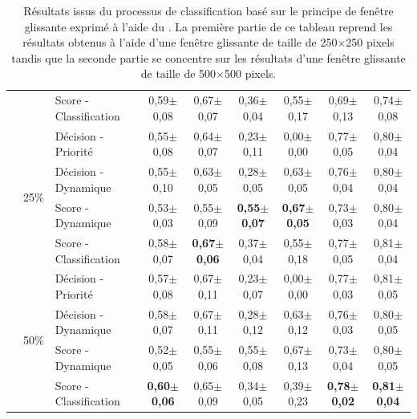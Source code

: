 {\begin{landscape}
\begin{table}[p]
\begin{tabular}{lllcccccc}
							        &                               & Score - Classification    & 0,59$\pm$0,08         & 0,67$\pm$0,07         & 0,36$\pm$0,04         & 0,55$\pm$0,17         & 0,69$\pm$0,13         & 0,74$\pm$0,08         \\ \cline{2-9}
							        & \multirow{4}{*}{25\%}         & Décision - Priorité       & 0,55$\pm$0,08         & 0,64$\pm$0,07         & 0,23$\pm$0,11         & 0,00$\pm$0,00         & 0,77$\pm$0,05         & 0,80$\pm$0,04         \\
							        &                               & Décision - Dynamique      & 0,55$\pm$0,10         & 0,63$\pm$0,05         & 0,28$\pm$0,05         & 0,63$\pm$0,05         & 0,76$\pm$0,04         & 0,80$\pm$0,04         \\
							        &                               & Score - Dynamique         & 0,53$\pm$0,03         & 0,55$\pm$0,09         & \textbf{0,55$\pm$0,07}& \textbf{0,67$\pm$0,05}& 0,73$\pm$0,03         & 0,80$\pm$0,04         \\
							        &                               & Score - Classification    & 0,58$\pm$0,07         & \textbf{0,67$\pm$0,06}& 0,37$\pm$0,04         & 0,55$\pm$0,18         & 0,77$\pm$0,05         & 0,81$\pm$0,04         \\ \cline{2-9}
							        & \multirow{4}{*}{50\%}         & Décision - Priorité       & 0,57$\pm$0,08         & 0,67$\pm$0,11         & 0,23$\pm$0,07         & 0,00$\pm$0,00         & 0,77$\pm$0,03         & 0,81$\pm$0,05         \\
							        &                               & Décision - Dynamique      & 0,58$\pm$0,07         & 0,67$\pm$0,11         & 0,28$\pm$0,12         & 0,63$\pm$0,12         & 0,76$\pm$0,03         & 0,80$\pm$0,05         \\
							        &                               & Score - Dynamique         & 0,52$\pm$0,05         & 0,55$\pm$0,06         & 0,55$\pm$0,08         & 0,67$\pm$0,13         & 0,73$\pm$0,04         & 0,80$\pm$0,05         \\ \rowcolor[HTML]{E7E6E6}
		                            &                               & Score - Classification    & \textbf{0,60$\pm$0,06}& 0,65$\pm$0,09         & 0,34$\pm$0,05         & 0,39$\pm$0,23         & \textbf{0,78$\pm$0,02}& \textbf{0,81$\pm$0,04}\\
		\bottomrule
    \end{tabular}
    \caption{Résultats issus du processus de classification basé sur le principe de fenêtre glissante exprimé à l'aide du \fscore. La première partie de ce tableau reprend les résultats obtenus à l'aide d'une fenêtre glissante de taille de 250$\times$250 pixels tandis que la seconde partie se concentre sur les résultats d'une fenêtre glissante de taille de 500$\times$500 pixels.}
    \label{tab:results_image_improvement_sliding_window}
\end{table}
\end{landscape}}

